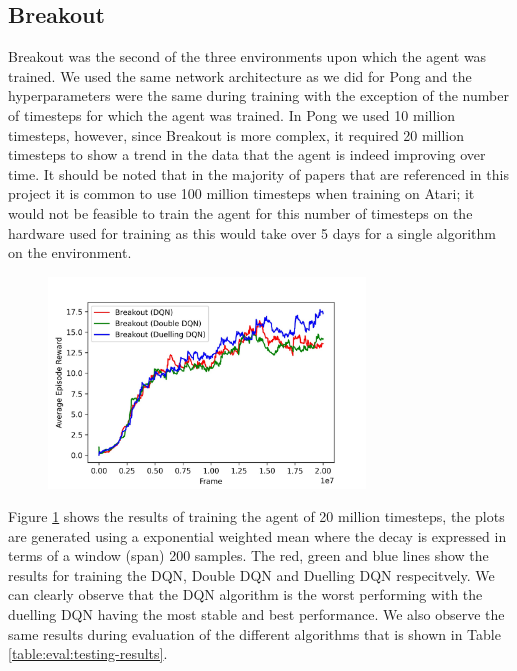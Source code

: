 \subsection{Breakout}
Breakout was the second of the three environments upon which the agent was trained. We used the same network architecture as we did for Pong and the hyperparameters were the same during training with the exception of the number of timesteps for which the agent was trained. In Pong we used 10 million timesteps, however, since Breakout is more complex, it required 20 million timesteps to show a trend in the data that the agent is indeed improving over time. It should be noted that in the majority of papers that are referenced in this project it is common to use 100 million timesteps when training on Atari; it would not be feasible to train the agent for this number of timesteps on the hardware used for training as this would take over 5 days for a single algorithm on the environment.

\begin{figure}[htbp]
	\centering
	\includegraphics[width=0.75\textwidth]{chapters/chapter5/images/breakout_plot.jpg}
	\caption[Breakout Training results]{
		\label{fig:breakout-train-results}
	}
\end{figure}

Figure \ref{fig:breakout-train-results} shows the results of training the agent of 20 million timesteps, the plots are generated using a exponential weighted mean where the decay is expressed in terms of a window (span) 200 samples. The red, green and blue lines show the results for training the DQN, Double DQN and Duelling DQN respecitvely. We can clearly observe that the DQN algorithm is the worst performing with the duelling DQN having the most stable and best performance. We also observe the same results during evaluation of the different algorithms that is shown in Table \ref{table:eval:testing-results}.

